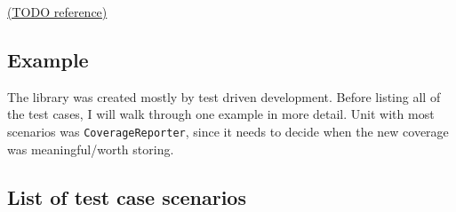 \documentclass{elteikthesis}[2018/06/06]
\begin{document}
\uline{(TODO reference)} \\

\subsection{Example}
\label{sec-3-3-2}
The library was created mostly by test driven development. Before listing all of the test cases, I will walk through one example in more detail. Unit with most scenarios was \lstinline{CoverageReporter}, since it needs to decide when the new coverage was meaningful/worth storing. \\

\subsection{List of test case scenarios}
\label{sec-3-3-3}
\end{document}
